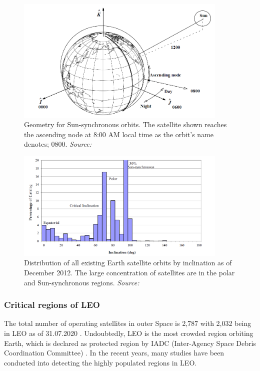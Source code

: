 \begin{figure}
\centering
\includegraphics[width=0.9\textwidth]{Images/sso.png}\caption{Geometry for Sun-synchronous orbits. The satellite shown reaches the ascending node at 8:00 AM local time as the orbit's name denotes; 0800. \textit{Source: \cite{Vallado}}}
\label{sso} 
\end{figure}

\begin{figure}
\centering
\includegraphics[width=0.9\textwidth]{Images/inclination-satellites.png}\caption{Distribution of all existing Earth satellite orbits by inclination as of December 2012. The large concentration of satellites are in the polar and Sun-synchronous regions. \textit{Source: \cite{Vallado}}}
\label{inclination-satellites} 
\end{figure}

\bigskip
\subsubsection{Critical regions of LEO}
\bigskip

The total number of operating satellites in outer Space is 2,787 with 2,032 being in LEO as of 31.07.2020 \cite{UCS}. Undoubtedly, LEO is the most crowded region orbiting Earth, which is declared as protected region by IADC (Inter-Agency Space Debris Coordination Committee) \cite{IADC 2007}. In the recent years, many studies have been conducted into detecting the highly populated regions in LEO.

